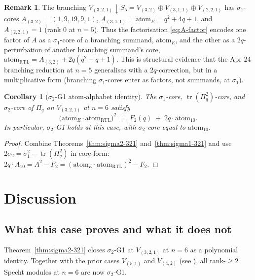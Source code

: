 \documentclass{article}
\newtheorem{corollary}[theorem]{Corollary}
\theoremstyle{definition}
\newtheorem{remark}[theorem]{Remark}
\begin{document}
\begin{remark}\label{rem:branching}
The branching $V_{(3,2,1)}\!\downarrow\!S_5 = V_{(3,2)}\oplus V_{(3,1,1)}\oplus V_{(2,2,1)}$ has
$\sigma_1$-cores $A_{(3,2)}=(1,9,19,9,1)$, $A_{(3,1,1)}=\mathrm{atom}_E=q^2+4q+1$, and
$A_{(2,2,1)}=1$ (rank 0 at $n=5$). Thus the factorisation \eqref{eq:A-factor}
encodes one factor of $A$ as a $\sigma_1$-core of a branching summand, $\mathrm{atom}_E$,
and the other as a $2q$-perturbation of another branching summand's core,
$\mathrm{atom}_{\mathrm{RTL}}=A_{(3,2)}+2q(q^2+q+1)$. This is structural evidence
that the Apr 24 branching reduction at $n=5$ \cite{ClioApr24-sigma2G1n5}
generalises with a $2q$-correction, but in a multiplicative form
(branching $\sigma_1$-cores enter as factors, not summands, at $\sigma_1$).
\end{remark}

\begin{corollary}[$\sigma_2$-G1 atom-alphabet identity]\label{cor:sigma2-id}
The $\sigma_1$-core, $\operatorname{tr}(\Pi_q^2)$-core, and $\sigma_2$-core of
$\Pi_q$ on $V_{(3,2,1)}$ at $n=6$ satisfy
\begin{equation}
\bigl(\mathrm{atom}_E\cdot\mathrm{atom}_{\mathrm{RTL}}\bigr)^{2}
\;=\;F_2(q)\;+\;2q\cdot \mathrm{atom}_{10}.
\label{eq:atom-id}
\end{equation}
In particular, $\sigma_2$-G1 holds at this case, with $\sigma_2$-core equal to
$\mathrm{atom}_{10}$.
\end{corollary}

\begin{proof}
Combine Theorems~\ref{thm:sigma2-321} and~\ref{thm:sigma1-321} and use
$2\sigma_2 = \sigma_1^2-\operatorname{tr}(\Pi_q^2)$ in core-form:
$2q\cdot A_{10}=A^2-F_2=(\mathrm{atom}_E\cdot\mathrm{atom}_{\mathrm{RTL}})^2-F_2$.
\end{proof}

\section{Discussion}

\subsection*{What this case proves and what it does not}

Theorem~\ref{thm:sigma2-321} closes $\sigma_2$-G1 at $V_{(3,2,1)}$ at $n=6$ as a
polynomial identity. Together with the prior cases $V_{(5,1)}$ and $V_{(4,2)}$
(see \cite{ClioApr25-rank1leak, ClioApr26-rank3-42}), all rank-$\geq 2$ Specht
modules at $n=6$ are now $\sigma_2$-G1.
\end{document}
